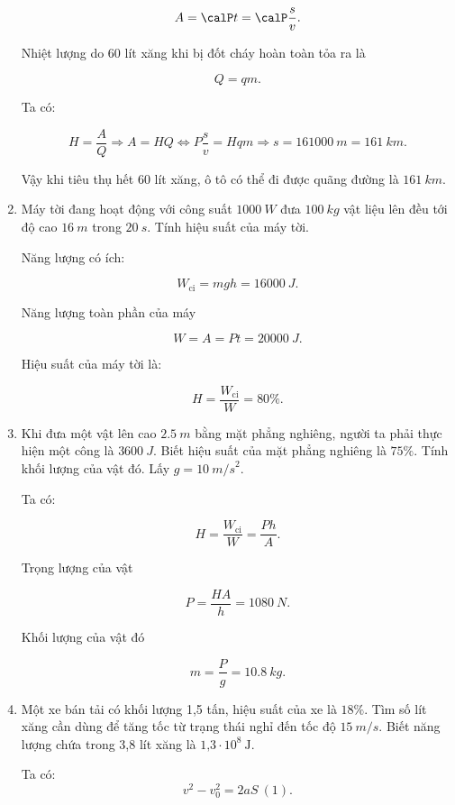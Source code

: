 \begin{enumerate}[label=\bfseries Câu \arabic*:, leftmargin=1.5cm]
{		$$A = \calP t = \calP \dfrac{s}{v}.$$
		
		Nhiệt lượng do 60 lít xăng khi bị đốt cháy hoàn toàn tỏa ra là 
		
		$$Q = qm.$$
		
		Ta có:
		
		$$H = \dfrac{A}{Q} \Rightarrow A = HQ  \Leftrightarrow P \dfrac{s}{v} = Hqm \Rightarrow s = \SI{161000}{m} = \SI{161}{km}.$$
		
		Vậy khi tiêu thụ hết 60 lít xăng, ô tô có thể đi được quãng đường là $\SI{161}{km}.$
	}
	\item {}
	
	
	{
		Máy tời đang hoạt động với công suất $\SI{1000}{W}$ đưa $\SI{100}{kg}$ vật liệu lên đều tới độ cao $\SI{16}{m}$ trong $\SI{20}{s}$. Tính hiệu suất của máy tời.
	}
	
	\hideall
	{	
		Năng lượng có ích:
		
		$$W_\text{ci} = mgh = \SI{16000}{J}.$$
		
		Năng lượng toàn phần của máy
		
		$$W = A = Pt = \SI{20000}{J}.$$
		
		Hiệu suất của máy tời là:
		
		$$H =\dfrac{W_\text{ci}}{W} = 80\%.$$
	}
	
	

	\item {}
	
	
	{
		Khi đưa một vật lên cao $\SI{2,5}{m}$ bằng mặt phẳng nghiêng, người ta phải thực hiện một công là $\SI{3600}{J}$. Biết hiệu suất của mặt phẳng nghiêng là $75\%$. Tính khối lượng của vật đó. Lấy $g = \SI{10}{m/s}^2$.
	}
	
	\hideall
	{	Ta có:
		
		$$H = \dfrac{W_\text{ci}}{W} = \dfrac{Ph}{A}.$$
		
		Trọng lượng của vật
		
		$$P = \dfrac{HA}{h} = \SI{1080}{N}.$$
		
		Khối lượng của vật đó
		
		$$m = \dfrac{P}{g} = \SI{10,8}{kg}.$$
	}
	\item {}
	
	
	{
		Một xe bán tải có khối lượng 1,5 tấn, hiệu suất của xe là $18\%$. Tìm số lít xăng cần dùng để tăng tốc từ trạng thái nghỉ đến tốc độ $\SI{15}{m/s}$. Biết năng lượng chứa trong 3,8 lít xăng là $\text{1,3}\cdot10^8\ \text{J}$.
	}
	
	\hideall
	{	
		Ta có: $$v^2-v_0^2= 2aS\ (1).$$
		
}
\end{enumerate}
